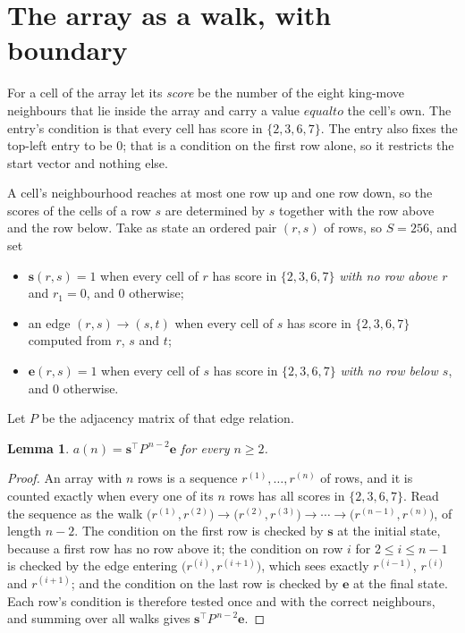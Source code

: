 \documentclass[11pt,a4paper]{article}
\theoremstyle{plain}
\newtheorem{lemma}[theorem]{Lemma}
\theoremstyle{definition}
\begin{document}
\section{The array as a walk, with boundary}

For a cell of the array let its \emph{score} be the number of the eight king-move neighbours that lie inside
the array and carry a value $equal to$ the cell's own. The entry's condition is that every cell
has score in $\{2,3,6,7\}$. The entry also fixes the top-left entry to be $0$; that is a condition on the first row alone, so it restricts the start vector and nothing else.

A cell's neighbourhood reaches at most one row up and one row down, so the scores of the
cells of a row $s$ are determined by $s$ together with the row above and the row below.
Take as state an ordered pair $(r,s)$ of rows, so $S=256$, and set
\begin{itemize}
\item $\mathbf{s}(r,s)=1$ when every cell of $r$ has score in $\{2,3,6,7\}$ \emph{with no row
above $r$} and $r_1=0$, and $0$ otherwise;
\item an edge $(r,s)\to(s,t)$ when every cell of $s$ has score in $\{2,3,6,7\}$ computed from
$r$, $s$ and $t$;
\item $\mathbf{e}(r,s)=1$ when every cell of $s$ has score in $\{2,3,6,7\}$ \emph{with no row
below $s$}, and $0$ otherwise.
\end{itemize}
Let $P$ be the adjacency matrix of that edge relation.

\begin{lemma}\label{lem:walk}
$a(n)=\mathbf{s}^{\!\top}P^{\,n-2}\mathbf{e}$ for every $n\ge2$.
\end{lemma}

\begin{proof}
An array with $n$ rows is a sequence $r^{(1)},\dots,r^{(n)}$ of rows, and it is counted
exactly when every one of its $n$ rows has all scores in $\{2,3,6,7\}$. Read the sequence as the
walk $\bigl(r^{(1)},r^{(2)}\bigr)\to\bigl(r^{(2)},r^{(3)}\bigr)\to\cdots\to
\bigl(r^{(n-1)},r^{(n)}\bigr)$, of length $n-2$. The condition on the first row is
checked by $\mathbf{s}$ at the initial state, because a first row has no row above it; the
condition on row $i$ for $2\le i\le n-1$ is checked by the edge entering
$\bigl(r^{(i)},r^{(i+1)}\bigr)$, which sees exactly $r^{(i-1)}$, $r^{(i)}$ and
$r^{(i+1)}$; and the condition on the last row is checked by $\mathbf{e}$ at the final
state. Each row's condition is therefore tested once and with the correct neighbours, and
summing over all walks gives $\mathbf{s}^{\!\top}P^{\,n-2}\mathbf{e}$.
\end{proof}
\end{document}
